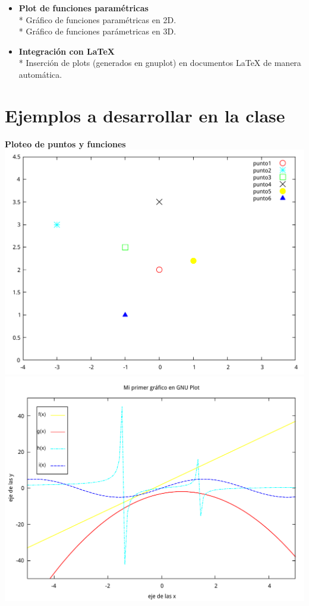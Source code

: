 \documentclass[11.5pt,a4paper]{article}
\begin{document}
\begin{itemize}
\item \textbf{Plot de funciones paramétricas}\\*
Gráfico de funciones paramétricas en 2D.\\*
Gráfico de funciones parámetricas en 3D.

\item \textbf{Integración con LaTeX}\\*
Inserción de plots (generados en gnuplot) en documentos LaTeX de manera automática.

\end{itemize}

\section{Ejemplos a desarrollar en la clase}
\vspace{1.0cm}

\textbf{Ploteo de puntos y funciones}\\

\includegraphics[scale=0.40]{ejemplo1.pdf} 
\includegraphics[scale=0.40]{ejemplo3.pdf} 
\end{document}
